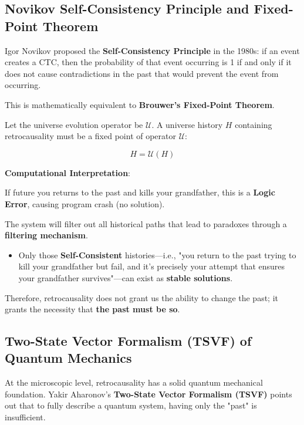 \subsection{Novikov Self-Consistency Principle and Fixed-Point Theorem}

Igor Novikov proposed the \textbf{Self-Consistency Principle} in the 1980s: if an event creates a CTC, then the probability of that event occurring is 1 if and only if it does not cause contradictions in the past that would prevent the event from occurring.

This is mathematically equivalent to \textbf{Brouwer's Fixed-Point Theorem}.

\begin{theorem}
Let the universe evolution operator be $\mathcal{U}$. A universe history $H$ containing retrocausality must be a fixed point of operator $\mathcal{U}$:

\begin{equation}
H = \mathcal{U}(H)
\end{equation}
\end{theorem}

\textbf{Computational Interpretation}:

If future you returns to the past and kills your grandfather, this is a \textbf{Logic Error}, causing program crash (no solution).

The system will filter out all historical paths that lead to paradoxes through a \textbf{filtering mechanism}.

\begin{itemize}
\item Only those \textbf{Self-Consistent} histories—i.e., "you return to the past trying to kill your grandfather but fail, and it's precisely your attempt that ensures your grandfather survives"—can exist as \textbf{stable solutions}.
\end{itemize}

Therefore, retrocausality does not grant us the ability to change the past; it grants the necessity that \textbf{the past must be so}.

\subsection{Two-State Vector Formalism (TSVF) of Quantum Mechanics}

At the microscopic level, retrocausality has a solid quantum mechanical foundation. Yakir Aharonov's \textbf{Two-State Vector Formalism (TSVF)} points out that to fully describe a quantum system, having only the "past" is insufficient.

